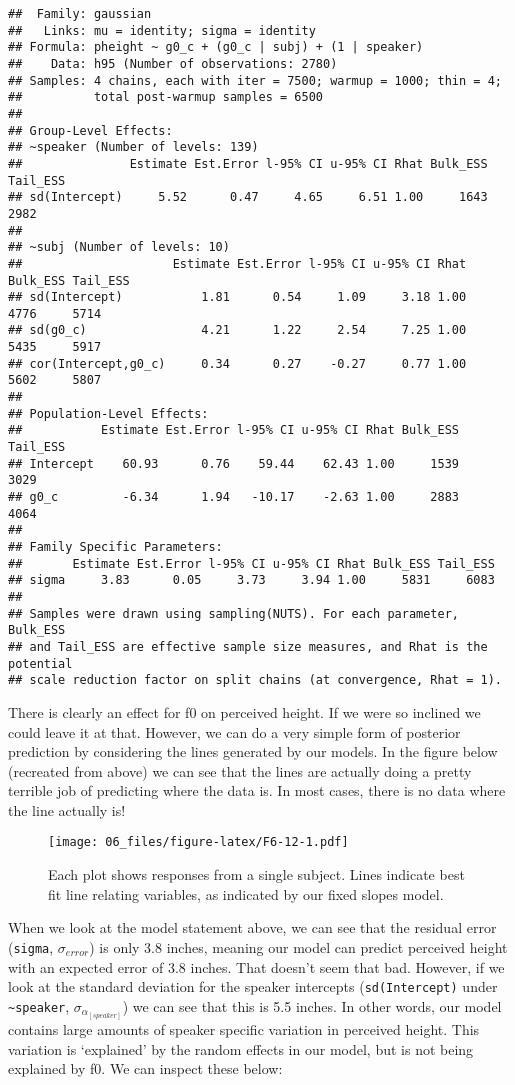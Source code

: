 \documentclass[
]{book}
\begin{document}
\begin{verbatim}
##  Family: gaussian 
##   Links: mu = identity; sigma = identity 
## Formula: pheight ~ g0_c + (g0_c | subj) + (1 | speaker) 
##    Data: h95 (Number of observations: 2780) 
## Samples: 4 chains, each with iter = 7500; warmup = 1000; thin = 4;
##          total post-warmup samples = 6500
## 
## Group-Level Effects: 
## ~speaker (Number of levels: 139) 
##               Estimate Est.Error l-95% CI u-95% CI Rhat Bulk_ESS Tail_ESS
## sd(Intercept)     5.52      0.47     4.65     6.51 1.00     1643     2982
## 
## ~subj (Number of levels: 10) 
##                     Estimate Est.Error l-95% CI u-95% CI Rhat Bulk_ESS Tail_ESS
## sd(Intercept)           1.81      0.54     1.09     3.18 1.00     4776     5714
## sd(g0_c)                4.21      1.22     2.54     7.25 1.00     5435     5917
## cor(Intercept,g0_c)     0.34      0.27    -0.27     0.77 1.00     5602     5807
## 
## Population-Level Effects: 
##           Estimate Est.Error l-95% CI u-95% CI Rhat Bulk_ESS Tail_ESS
## Intercept    60.93      0.76    59.44    62.43 1.00     1539     3029
## g0_c         -6.34      1.94   -10.17    -2.63 1.00     2883     4064
## 
## Family Specific Parameters: 
##       Estimate Est.Error l-95% CI u-95% CI Rhat Bulk_ESS Tail_ESS
## sigma     3.83      0.05     3.73     3.94 1.00     5831     6083
## 
## Samples were drawn using sampling(NUTS). For each parameter, Bulk_ESS
## and Tail_ESS are effective sample size measures, and Rhat is the potential
## scale reduction factor on split chains (at convergence, Rhat = 1).
\end{verbatim}

There is clearly an effect for f0 on perceived height. If we were so inclined we could leave it at that. However, we can do a very simple form of posterior prediction by considering the lines generated by our models. In the figure below (recreated from above) we can see that the lines are actually doing a pretty terrible job of predicting where the data is. In most cases, there is no data where the line actually is!

\begin{figure}
\centering
\texttt{[image: 06\_files/figure-latex/F6-12-1.pdf]}
\caption{\label{fig:F6-12}Each plot shows responses from a single subject. Lines indicate best fit line relating variables, as indicated by our fixed slopes model.}
\end{figure}

When we look at the model statement above, we can see that the residual error (\texttt{sigma}, \(\sigma_{error}\)) is only 3.8 inches, meaning our model can predict perceived height with an expected error of 3.8 inches. That doesn't seem that bad. However, if we look at the standard deviation for the speaker intercepts (\texttt{sd(Intercept)} under \texttt{\textasciitilde{}speaker}, \(\sigma_{\alpha_{[speaker]}}\)) we can see that this is 5.5 inches. In other words, our model contains large amounts of speaker specific variation in perceived height. This variation is `explained' by the random effects in our model, but is not being explained by f0. We can inspect these below:
\end{document}
